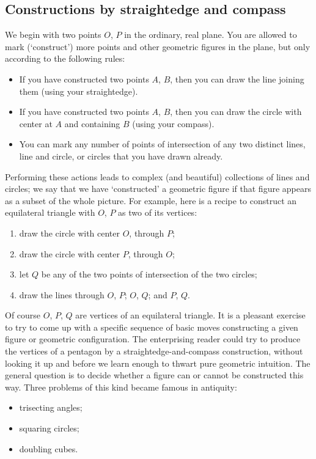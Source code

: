 \subsection{Constructions by straightedge and compass}%
\label{subsec:fields:constructions-by-straightedge-and-compass}
We begin with two points $O$, $P$ in the ordinary, real plane. You are
allowed to mark (`construct') more points and other geometric figures
in the plane, but only according to the following rules:
\begin{itemize}
\item If you have constructed two points $A$, $B$, then you can draw
  the line joining them (using your straightedge).
\item If you have constructed two points $A$, $B$, then you can draw
  the circle with center at $A$ and containing $B$ (using your
  compass).
\item You can mark any number of points of intersection of any two
  distinct lines, line and circle, or circles that you have drawn
  already.
\end{itemize}
Performing these actions leads to complex (and beautiful) collections
of lines and circles; we say that we have `constructed' a geometric
figure if that figure appears as a subset of the whole picture.  For
example, here is a recipe to construct an equilateral triangle with
$O$, $P$ as two of its vertices:
\begin{enumerate}
\item draw the circle with center $O$, through $P$;
\item draw the circle with center $P$, through $O$;
\item let $Q$ be any of the two points of intersection of the two
  circles;
\item draw the lines through $O$, $P$; $O$, $Q$; and $P$, $Q$.
\end{enumerate}
Of course $O$, $P$, $Q$ are vertices of an equilateral triangle.  It
is a pleasant exercise to try to come up with a specific sequence of
basic moves constructing a given figure or geometric
configuration. The enterprising reader could try to produce the
vertices of a pentagon by a straightedge-and-compass construction,
without looking it up and before we learn enough to thwart pure
geometric intuition.  The general question is to decide whether a
figure can or cannot be constructed this way. Three problems of this
kind became famous in antiquity:
\begin{itemize}
\item trisecting angles;
\item squaring circles;
\item doubling cubes.
\end{itemize}
